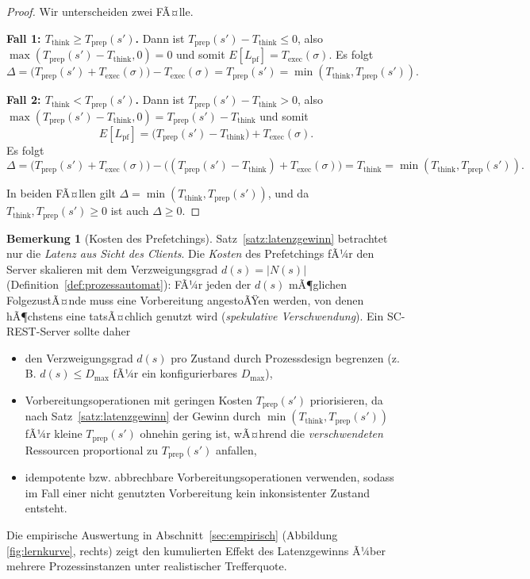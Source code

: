 ﻿\documentclass[a4paper,12pt]{article}
\theoremstyle{definition}
\newtheorem{bemerkung}{Bemerkung}
\begin{document}
\begin{proof}
	Wir unterscheiden zwei FÃ¤lle.

	\textbf{Fall 1: $T_{\mathrm{think}} \geq T_{\mathrm{prep}}(s')$.} Dann ist
	$T_{\mathrm{prep}}(s') - T_{\mathrm{think}} \leq 0$, also
	$\max(T_{\mathrm{prep}}(s')-T_{\mathrm{think}},0) = 0$ und somit
	$E[L_{\mathrm{pf}}] = T_{\mathrm{exec}}(\sigma)$. Es folgt
	\[
		\Delta = \bigl(T_{\mathrm{prep}}(s') + T_{\mathrm{exec}}(\sigma)\bigr)
		- T_{\mathrm{exec}}(\sigma) = T_{\mathrm{prep}}(s')
		= \min(T_{\mathrm{think}}, T_{\mathrm{prep}}(s')).
	\]

	\textbf{Fall 2: $T_{\mathrm{think}} < T_{\mathrm{prep}}(s')$.} Dann ist
	$T_{\mathrm{prep}}(s')-T_{\mathrm{think}} > 0$, also
	$\max(T_{\mathrm{prep}}(s')-T_{\mathrm{think}},0) = T_{\mathrm{prep}}(s')-T_{\mathrm{think}}$
	und somit
	\[
		E[L_{\mathrm{pf}}] = \bigl(T_{\mathrm{prep}}(s')-T_{\mathrm{think}}\bigr)
		+ T_{\mathrm{exec}}(\sigma).
	\]
	Es folgt
	\[
		\Delta = \bigl(T_{\mathrm{prep}}(s')+T_{\mathrm{exec}}(\sigma)\bigr)
		- \bigl((T_{\mathrm{prep}}(s')-T_{\mathrm{think}})+T_{\mathrm{exec}}(\sigma)\bigr)
		= T_{\mathrm{think}}
		= \min(T_{\mathrm{think}}, T_{\mathrm{prep}}(s')).
	\]

	In beiden FÃ¤llen gilt $\Delta = \min(T_{\mathrm{think}}, T_{\mathrm{prep}}(s'))$, und
	da $T_{\mathrm{think}}, T_{\mathrm{prep}}(s') \geq 0$ ist auch $\Delta \geq 0$.
	\qedhere
\end{proof}

\begin{bemerkung}[Kosten des Prefetchings]
	\label{bem:prefetch-kosten}
	Satz~\ref{satz:latenzgewinn} betrachtet nur die \emph{Latenz aus Sicht des Clients}.
	Die \emph{Kosten} des Prefetchings fÃ¼r den Server skalieren mit dem
	Verzweigungsgrad $d(s)=|N(s)|$ (Definition~\ref{def:prozessautomat}): FÃ¼r jeden der
	$d(s)$ mÃ¶glichen FolgezustÃ¤nde muss eine Vorbereitung angestoÃŸen werden, von denen
	hÃ¶chstens eine tatsÃ¤chlich genutzt wird (\emph{spekulative Verschwendung}). Ein
	SC-REST-Server sollte daher
	\begin{itemize}
		\item den Verzweigungsgrad $d(s)$ pro Zustand durch Prozessdesign begrenzen
		      (z.\,B. $d(s) \leq D_{\max}$ fÃ¼r ein konfigurierbares $D_{\max}$),
		\item Vorbereitungsoperationen mit geringen Kosten $T_{\mathrm{prep}}(s')$
		      priorisieren, da nach Satz~\ref{satz:latenzgewinn} der Gewinn durch
		      $\min(T_{\mathrm{think}},T_{\mathrm{prep}}(s'))$ fÃ¼r kleine
		      $T_{\mathrm{prep}}(s')$ ohnehin gering ist, wÃ¤hrend die
		      \emph{verschwendeten} Ressourcen proportional zu $T_{\mathrm{prep}}(s')$
		      anfallen,
		\item idempotente bzw. abbrechbare Vorbereitungsoperationen verwenden, sodass im
		      Fall einer nicht genutzten Vorbereitung kein inkonsistenter Zustand
		      entsteht.
	\end{itemize}
	Die empirische Auswertung in Abschnitt~\ref{sec:empirisch} (Abbildung
	\ref{fig:lernkurve}, rechts) zeigt den kumulierten Effekt des Latenzgewinns Ã¼ber
	mehrere Prozessinstanzen unter realistischer Trefferquote.
\end{bemerkung}
\end{document}
